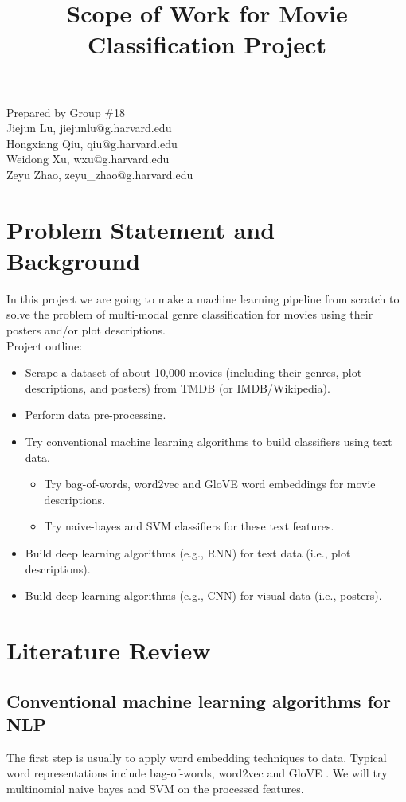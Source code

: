 \documentclass[12pt]{article}
\title{Scope of Work for Movie Classification Project}
\date{\vspace{-10ex}}
\begin{document}
\maketitle
\noindent
Prepared by Group \#18 \\
Jiejun Lu, jiejunlu@g.harvard.edu\\
Hongxiang Qiu, qiu@g.harvard.edu\\
Weidong Xu, wxu@g.harvard.edu\\
Zeyu Zhao, zeyu\_zhao@g.harvard.edu


\section*{Problem Statement and Background}
In this project we are going to make a machine learning pipeline from scratch to solve the problem of multi-modal genre classification for movies using their posters and/or plot descriptions.\\

\noindent
Project outline:
\begin{itemize}
  \item Scrape a dataset of about 10,000 movies (including their genres, plot descriptions, and posters) from TMDB (or IMDB/Wikipedia).
  \item Perform data pre-processing.
  \item Try conventional machine learning algorithms to build classifiers using text data.
  \begin{itemize}
  	\item Try bag-of-words, word2vec and GloVE word embeddings for movie descriptions.
    \item Try naive-bayes and SVM classifiers for these text features.
  \end{itemize}
  \item Build deep learning algorithms (e.g., RNN) for text data (i.e., plot descriptions).
  \item Build deep learning algorithms (e.g., CNN) for visual data (i.e., posters).
\end{itemize}

\section*{Literature Review}
\subsection*{Conventional machine learning algorithms for NLP}
The first step is usually to apply word embedding techniques to data. Typical word representations include bag-of-words, word2vec \cite{word2vec} and GloVE \cite{GloVE}. We will try multinomial naive bayes and SVM on the processed features.
\end{document}
